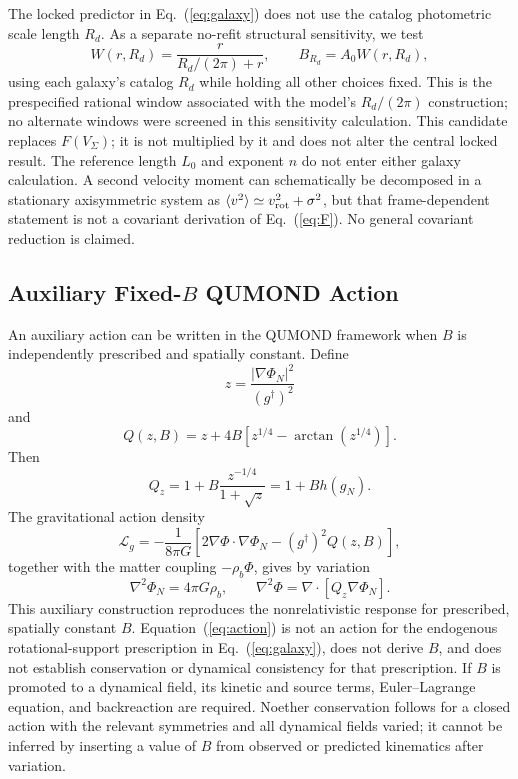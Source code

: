\documentclass[aps,prd,reprint,superscriptaddress,showpacs,floatfix,longbibliography]{revtex4-2}
\begin{document}
The locked predictor in Eq.~(\ref{eq:galaxy}) does not use the catalog photometric scale length $R_d$. As a separate no-refit structural sensitivity, we test
\[
W(r,R_d)=\frac{r}{R_d/(2\pi)+r},\qquad B_{R_d}=A_0W(r,R_d),
\]
using each galaxy's catalog $R_d$ while holding all other choices fixed. This is the prespecified rational window associated with the model's $R_d/(2\pi)$ construction; no alternate windows were screened in this sensitivity calculation. This candidate replaces $F(V_\Sigma)$; it is not multiplied by it and does not alter the central locked result. The reference length $L_0$ and exponent $n$ do not enter either galaxy calculation. A second velocity moment can schematically be decomposed in a stationary axisymmetric system as $\langle v^2\rangle\simeq v_{\rm rot}^2+\sigma^2$, but that frame-dependent statement is not a covariant derivation of Eq.~(\ref{eq:F}). No general covariant reduction is claimed.

\subsection{Auxiliary Fixed-$B$ QUMOND Action}

An auxiliary action can be written in the QUMOND framework \cite{ref6} when $B$ is independently prescribed and spatially constant. Define
\begin{equation}
z=\frac{|\nabla\Phi_N|^2}{(g^\dagger)^2}
\label{eq:z}
\end{equation}
and
\begin{equation}
Q(z,B)=z+4B\left[z^{1/4}-\arctan\!\left(z^{1/4}\right)\right].
\label{eq:Q}
\end{equation}
Then
\begin{equation}
Q_z=1+B\frac{z^{-1/4}}{1+\sqrt z}
=1+B h(g_N).
\label{eq:Qz}
\end{equation}
The gravitational action density
\begin{equation}
\mathcal L_g=-\frac{1}{8\pi G}
\left[2\nabla\Phi\cdot\nabla\Phi_N-(g^\dagger)^2Q(z,B)\right],
\label{eq:action}
\end{equation}
together with the matter coupling $-\rho_b\Phi$, gives by variation
\begin{equation}
\nabla^2\Phi_N=4\pi G\rho_b,
\qquad
\nabla^2\Phi=\nabla\cdot\left[Q_z\nabla\Phi_N\right].
\label{eq:fields}
\end{equation}
This auxiliary construction reproduces the nonrelativistic response for prescribed, spatially constant $B$. Equation~(\ref{eq:action}) is not an action for the endogenous rotational-support prescription in Eq.~(\ref{eq:galaxy}), does not derive $B$, and does not establish conservation or dynamical consistency for that prescription. If $B$ is promoted to a dynamical field, its kinetic and source terms, Euler--Lagrange equation, and backreaction are required. Noether conservation follows for a closed action with the relevant symmetries and all dynamical fields varied; it cannot be inferred by inserting a value of $B$ from observed or predicted kinematics after variation.
\end{document}
